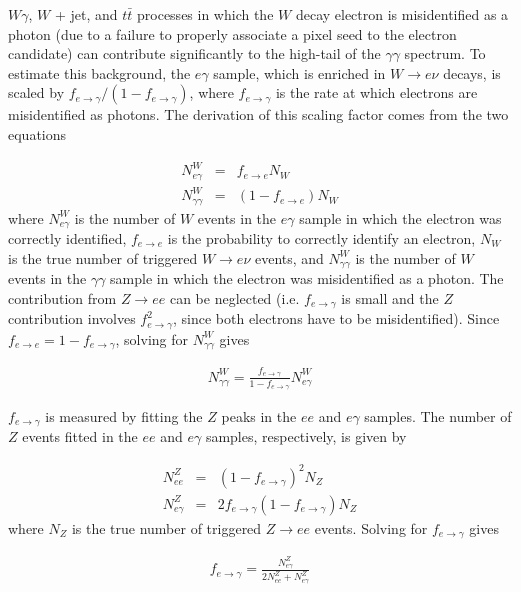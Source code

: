 \documentclass[dissertation_bw.tex]{subfiles}
\begin{document}
$W\gamma$, $W$ + jet, and $t\bar{t}$ processes in which the $W$ decay electron is misidentified as a photon (due to a failure to properly associate a pixel seed to the electron candidate) can contribute significantly to the high-\MET tail of the $\gamma\gamma$ \MET spectrum.  To estimate this background, the $e\gamma$ sample, which is enriched in $W\rightarrow e\nu$ decays, is scaled by $f_{e\rightarrow\gamma}/(1 - f_{e\rightarrow\gamma})$, where $f_{e\rightarrow\gamma}$ is the rate at which electrons are misidentified as photons.  The derivation of this scaling factor comes from the two equations

\begin{eqnarray}
N_{e\gamma}^{W} &=& f_{e\rightarrow e}N_{W}\\
N_{\gamma\gamma}^{W} &=& (1 - f_{e\rightarrow e})N_{W}
\end{eqnarray}
%
where $N_{e\gamma}^{W}$ is the number of $W$ events in the $e\gamma$ sample in which the electron was correctly identified, $f_{e\rightarrow e}$ is the probability to correctly identify an electron, $N_{W}$ is the true number of triggered $W\rightarrow e\nu$ events, and $N_{\gamma\gamma}^{W}$ is the number of $W$ events in the $\gamma\gamma$ sample in which the electron was misidentified as a photon.  The contribution from $Z\rightarrow ee$ can be neglected (i.e. $f_{e\rightarrow\gamma}$ is small and the $Z$ contribution involves $f_{e\rightarrow\gamma}^{2}$, since both electrons have to be misidentified).  Since $f_{e\rightarrow e} = 1 - f_{e\rightarrow\gamma}$, solving for $N_{\gamma\gamma}^{W}$ gives

\begin{eqnarray}
N_{\gamma\gamma}^{W} = \frac{f_{e\rightarrow\gamma}}{1 - f_{e\rightarrow\gamma}}N_{e\gamma}^{W}
\end{eqnarray}

$f_{e\rightarrow\gamma}$ is measured by fitting the $Z$ peaks in the $ee$ and $e\gamma$ samples.  The number of $Z$ events fitted in the $ee$ and $e\gamma$ samples, respectively, is given by

\begin{eqnarray}
N_{ee}^{Z} &=& (1 - f_{e\rightarrow\gamma})^{2}N_{Z} \\
N_{e\gamma}^{Z} &=& 2f_{e\rightarrow\gamma}(1 - f_{e\rightarrow\gamma})N_{Z}
\end{eqnarray}
%
where $N_{Z}$ is the true number of triggered $Z\rightarrow ee$ events.  Solving for $f_{e\rightarrow\gamma}$ gives

\begin{eqnarray}
f_{e\rightarrow\gamma} = \frac{N_{e\gamma}^{Z}}{2N_{ee}^{Z} + N_{e\gamma}^{Z}}
\label{eq:feg}
\end{eqnarray}
\end{document}
